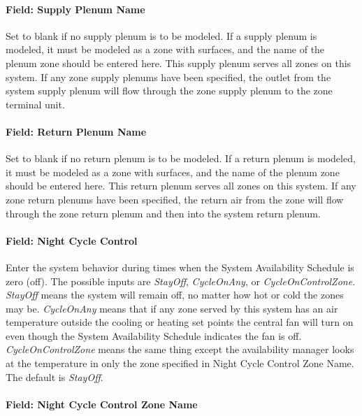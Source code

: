 \paragraph{Field: Supply Plenum Name}\label{field-supply-plenum-name-6}

Set to blank if no supply plenum is to be modeled. If a supply plenum is modeled, it must be modeled as a zone with surfaces, and the name of the plenum zone should be entered here. This supply plenum serves all zones on this system. If any zone supply plenums have been specified, the outlet from the system supply plenum will flow through the zone supply plenum to the zone terminal unit.

\paragraph{Field: Return Plenum Name}\label{field-return-plenum-name-7}

Set to blank if no return plenum is to be modeled. If a return plenum is modeled, it must be modeled as a zone with surfaces, and the name of the plenum zone should be entered here. This return plenum serves all zones on this system. If any zone return plenums have been specified, the return air from the zone will flow through the zone return plenum and then into the system return plenum.

\paragraph{Field: Night Cycle Control}\label{field-night-cycle-control-1}

Enter the system behavior during times when the System Availability Schedule is zero (off). The possible inputs are \emph{StayOff}, \emph{CycleOnAny}, or \emph{CycleOnControlZone}. \emph{StayOff} means the system will remain off, no matter how hot or cold the zones may be. \emph{CycleOnAny} means that if any zone served by this system has an air temperature outside the cooling or heating set points the central fan will turn on even though the System Availability Schedule indicates the fan is off. \emph{CycleOnControlZone} means the same thing except the availability manager looks at the temperature in only the zone specified in Night Cycle Control Zone Name. The default is \emph{StayOff}.

\paragraph{Field: Night Cycle Control Zone Name}\label{field-night-cycle-control-zone-name-1}

